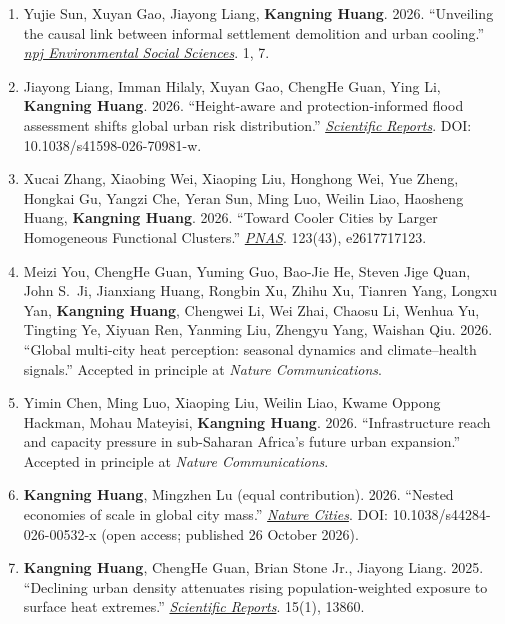 \documentclass[11pt,letterpaper]{article}
\begin{document}
\begin{enumerate}
  \item Yujie Sun, Xuyan Gao, Jiayong Liang, \textbf{Kangning Huang}. 2026. ``Unveiling the causal link between informal settlement demolition and urban cooling.'' \href{https://doi.org/10.1038/s44432-026-00009-1}{\textit{npj Environmental Social Sciences}}. 1, 7.

  \item Jiayong Liang, Imman Hilaly, Xuyan Gao, ChengHe Guan, Ying Li, \textbf{Kangning Huang}. 2026. ``Height-aware and protection-informed flood assessment shifts global urban risk distribution.'' \href{https://www.nature.com/articles/s41598-026-70981-w}{\textit{Scientific Reports}}. DOI: 10.1038/s41598-026-70981-w.

  \item Xucai Zhang, Xiaobing Wei, Xiaoping Liu, Honghong Wei, Yue Zheng, Hongkai Gu, Yangzi Che, Yeran Sun, Ming Luo, Weilin Liao, Haosheng Huang, \textbf{Kangning Huang}. 2026. ``Toward Cooler Cities by Larger Homogeneous Functional Clusters.'' \href{https://doi.org/10.1073/pnas.2617717123}{\textit{PNAS}}. 123(43), e2617717123.
  \item Meizi You, ChengHe Guan, Yuming Guo, Bao-Jie He, Steven Jige Quan, John S.\ Ji, Jianxiang Huang, Rongbin Xu, Zhihu Xu, Tianren Yang, Longxu Yan, \textbf{Kangning Huang}, Chengwei Li, Wei Zhai, Chaosu Li, Wenhua Yu, Tingting Ye, Xiyuan Ren, Yanming Liu, Zhengyu Yang, Waishan Qiu. 2026. ``Global multi-city heat perception: seasonal dynamics and climate--health signals.'' Accepted in principle at \textit{Nature Communications}.

  \item Yimin Chen, Ming Luo, Xiaoping Liu, Weilin Liao, Kwame Oppong Hackman, Mohau Mateyisi, \textbf{Kangning Huang}. 2026. ``Infrastructure reach and capacity pressure in sub-Saharan Africa's future urban expansion.'' Accepted in principle at \textit{Nature Communications}.

  \item \textbf{Kangning Huang}, Mingzhen Lu (equal contribution). 2026. ``Nested economies of scale in global city mass.'' \href{https://doi.org/10.1038/s44284-026-00532-x}{\textit{Nature Cities}}. DOI: 10.1038/s44284-026-00532-x (open access; published 26 October 2026).

  \item \textbf{Kangning Huang}, ChengHe Guan, Brian Stone Jr., Jiayong Liang. 2025. ``Declining urban density attenuates rising population-weighted exposure to surface heat extremes.'' \href{https://www.nature.com/articles/s41598-025-96045-z}{\textit{Scientific Reports}}. 15(1), 13860.


\end{enumerate}
\end{document}
